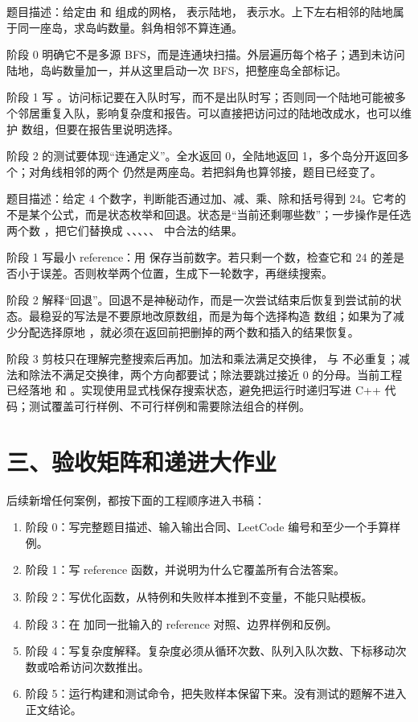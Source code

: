 题目描述：给定由  和  组成的网格， 表示陆地， 表示水。上下左右相邻的陆地属于同一座岛，求岛屿数量。斜角相邻不算连通。

阶段 0 明确它不是多源 BFS，而是连通块扫描。外层遍历每个格子；遇到未访问陆地，岛屿数量加一，并从这里启动一次 BFS，把整座岛全部标记。

阶段 1 写 。访问标记要在入队时写，而不是出队时写；否则同一个陆地可能被多个邻居重复入队，影响复杂度和报告。可以直接把访问过的陆地改成水，也可以维护  数组，但要在报告里说明选择。

阶段 2 的测试要体现“连通定义”。全水返回 0，全陆地返回 1，多个岛分开返回多个；对角线相邻的两个  仍然是两座岛。若把斜角也算邻接，题目已经变了。


题目描述：给定 4 个数字，判断能否通过加、减、乘、除和括号得到 24。它考的不是某个公式，而是状态枚举和回退。状态是“当前还剩哪些数”；一步操作是任选两个数 ，把它们替换成 、、、、、 中合法的结果。

阶段 1 写最小 reference：用  保存当前数字。若只剩一个数，检查它和 24 的差是否小于误差。否则枚举两个位置，生成下一轮数字，再继续搜索。

阶段 2 解释“回退”。回退不是神秘动作，而是一次尝试结束后恢复到尝试前的状态。最稳妥的写法是不要原地改原数组，而是为每个选择构造  数组；如果为了减少分配选择原地 ，就必须在返回前把删掉的两个数和插入的结果恢复。

阶段 3 剪枝只在理解完整搜索后再加。加法和乘法满足交换律， 与  不必重复；减法和除法不满足交换律，两个方向都要试；除法要跳过接近 0 的分母。当前工程已经落地  和 。实现使用显式栈保存搜索状态，避免把运行时递归写进 C++ 代码；测试覆盖可行样例、不可行样例和需要除法组合的样例。

\section{三、验收矩阵和递进大作业}

后续新增任何案例，都按下面的工程顺序进入书稿：

\begin{enumerate}
  \item 阶段 0：写完整题目描述、输入输出合同、LeetCode 编号和至少一个手算样例。
  \item 阶段 1：写 reference 函数，并说明为什么它覆盖所有合法答案。
  \item 阶段 2：写优化函数，从特例和失败样本推到不变量，不能只贴模板。
  \item 阶段 3：在  加同一批输入的 reference 对照、边界样例和反例。
  \item 阶段 4：写复杂度解释。复杂度必须从循环次数、队列入队次数、下标移动次数或哈希访问次数推出。
  \item 阶段 5：运行构建和测试命令，把失败样本保留下来。没有测试的题解不进入正文结论。
\end{enumerate}

